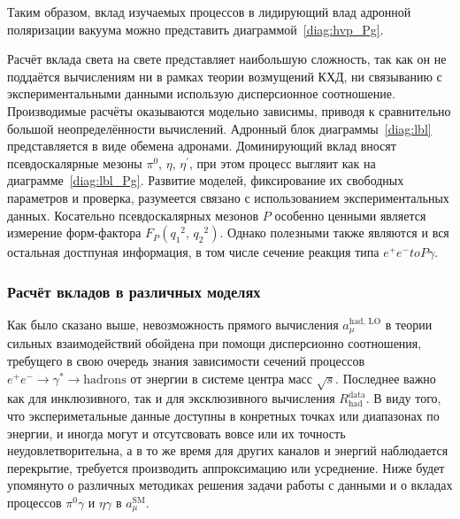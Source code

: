 Таким образом,
вклад изучаемых процессов в лидирующий влад адронной поляризации вакуума можно представить диаграммой~\ref{diag:hvp_Pg}.

Расчёт вклада света на свете представляет наибольшую сложность,
так как он не поддаётся вычислениям ни в рамках теории возмущений КХД,
ни связыванию с экспериментальными данными использую дисперсионное соотношение.
Производимые расчёты оказываются модельно зависимы,
приводя к сравнительно большой неопределённости вычислений.
Адронный блок диаграммы~\ref{diag:lbl} представляется в виде обемена адронами.
Доминирующий вклад вносят псевдоскалярные мезоны $\pi^0$, $\eta$, $\eta^\prime$,
при этом процесс выгляит как на диаграмме~\ref{diag:lbl_Pg}.
Развитие моделей,
фиксирование их свободных параметров и проверка,
разумеется связано с использованием экспериментальных данных.
Косательно псевдоскалярных мезонов $P$ особенно ценными является измерение форм-фактора
$F_P ( {q_1}^2, \, {q_2}^2 )$.
Однако полезными также являются и вся остальная достпуная информация,
в том числе сечение реакция типа $e^+ e^- to P \gamma$.


\subsubsection{Расчёт вкладов в различных моделях}
\label{contribution-calculation}


Как было сказано выше,
невозможность прямого вычисления $a_\mu^{\text{had, LO}}$
в теории сильных взаимодействий обойдена при помощи дисперсионно соотношения,
требущего в свою очередь знания зависимости сечений процессов
$e^+ e^- \to \gamma^* \to \text{hadrons}$
от энергии в системе центра масс $\sqrt{s}$.
Последнее важно как для инклюзивного,
так и для эксклюзивного вычисления $R_{\text{had}}^{\text{data}}$.
В виду того,
что экспериметальные данные доступны в конретных точках или диапазонах по энергии,
и иногда могут и отсутсвовать вовсе или их точность неудовлетворительна,
а в то же время для других каналов и энергий наблюдается перекрытие,
требуется производить аппроксимацию или усреднение.
Ниже будет упомянуто о различных методиках решения задачи работы с данными
и о вкладах процессов $\pi^0 \gamma$ и $\eta \gamma$ в $a_\mu^{\text{SM}}$.


